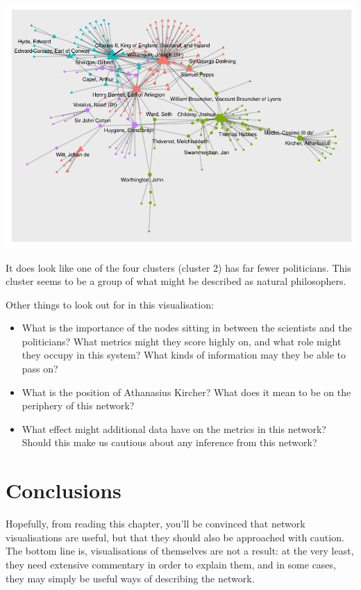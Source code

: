 \documentclass[
]{book}
\begin{document}
\includegraphics{_main_files/figure-latex/unnamed-chunk-67-1.pdf}

It does look like one of the four clusters (cluster 2) has far fewer politicians. This cluster seems to be a group of what might be described as natural philosophers.

Other things to look out for in this visualisation:

\begin{itemize}
\item
  What is the importance of the nodes sitting in between the scientists and the politicians? What metrics might they score highly on, and what role might they occupy in this system? What kinds of information may they be able to pass on?
\item
  What is the position of Athanasius Kircher? What does it mean to be on the periphery of this network?
\item
  What effect might additional data have on the metrics in this network? Should this make us cautious about any inference from this network?
\end{itemize}

\hypertarget{conclusions-2}{%
\section{Conclusions}\label{conclusions-2}}

Hopefully, from reading this chapter, you'll be convinced that network visualisations are useful, but that they should also be approached with caution. The bottom line is, visualisations of themselves are not a result: at the very least, they need extensive commentary in order to explain them, and in some cases, they may simply be useful ways of describing the network.
\end{document}
